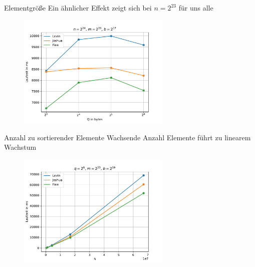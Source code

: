 \documentclass[ngerman,aspectratio=169,10pt]{beamer}
\begin{document}
\begin{frame}{Elementgröße}
Ein ähnlicher Effekt zeigt sich bei $n=2^{23}$ für uns alle
\begin{figure}[H]
    \centering
    \includegraphics[width=0.65\textwidth]{q__n_16777216_m_8388608_b_131072.pdf}
    \label{fig:f5}
\end{figure}
\end{frame}

\begin{frame}{Anzahl zu sortierender Elemente}
Wachsende Anzahl Elemente führt zu linearem Wachstum
\begin{figure}[H]
    \centering
    \includegraphics[width=0.65\textwidth]{Figure_3.pdf}
    \label{fig:f2}
\end{figure}
\end{frame}
\end{document}
